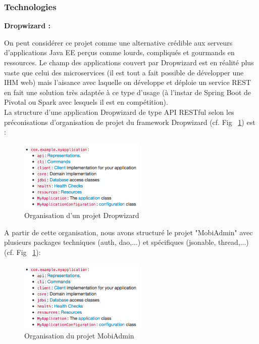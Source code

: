 \begin{itemize}
\subsubsection{Technologies}

\textbf{Dropwizard :}

On peut considérer ce projet comme une alternative crédible aux serveurs d'applications Java EE perçus comme lourds, compliqués et gourmands en ressources. Le champ des applications couvert par Dropwizard est en réalité plus vaste que celui des microservices (il est tout a fait possible de développer une IHM web) mais l'aisance avec laquelle on développe et déploie un service REST en fait une solution très adaptée à ce type d'usage (à l'instar de Spring Boot de Pivotal ou Spark avec lesquels il est en compétition).\\
La structure d'une application Dropwizard de type API RESTful selon les préconisations d'organisation de projet du framework Dropwizard  (cf. Fig ~\ref{Organisation_Dropwizard}) est : 

\begin{figure}[!h]
\centering
\includegraphics[width=6cm,heigth=6cm]{images/Dropwizard_Project.png}
\caption{\label{Organisation_Dropwizard}Organisation d'un projet Dropwizard}
\end{figure} 

A partir de cette organisation, nous avons structuré le projet "MobiAdmin" avec plusieurs packages techniques (auth, dao,...) et spécifiques (jsonable, thread,...) (cf. Fig ~\ref{Organisation_Dropwizard}): 

\begin{figure}[!h]
\centering
\includegraphics[width=6cm,heigth=6cm]{images/Dropwizard_Project.png}
\caption{\label{Organisation_MobiAdmin}Organisation du projet MobiAdmin}
\end{figure} 


\end{itemize}
